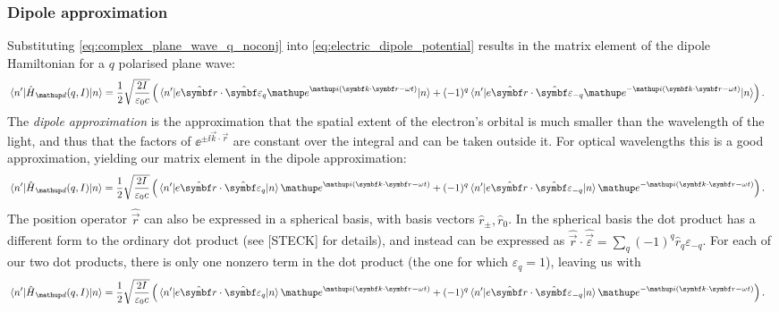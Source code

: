 \subsubsection{Dipole approximation}

Substituting \eqref{eq:complex_plane_wave_q_noconj} into \eqref{eq:electric_dipole_potential} results in the matrix element of the dipole Hamiltonian for a $q$ polarised plane wave:
\begin{align}
\matrixel{n^\prime}{\hat H_\up{d}(q,I)}{n} &= 
\frac12\sqrt{\frac{2I}{\varepsilon_0 c}}\left(
\matrixel{n^\prime}
  {e\hat{\vec r}\cdot\hat{\vec\varepsilon}_q \ee^{\ii(\vec k \cdot \vec r - \omega t)}}
  {n}
+(-1)^q
\matrixel{n^\prime}
  {e\hat{\vec r}\cdot\hat{\vec\varepsilon}_{-q} \ee^{-\ii(\vec k \cdot \vec r - \omega t)}}
  {n}\right).
\end{align}
The \emph{dipole approximation} is the approximation that the spatial extent of the electron's orbital is much smaller than the wavelength of the light, and thus that the factors of $\ee^{\pm\ii\vec k\cdot\vec r}$ are constant over the integral and can be taken outside it. For optical wavelengths this is a good approximation, yielding our matrix element in the dipole approximation:
\begin{align}
\matrixel{n^\prime}{\hat H_\up{d}(q,I)}{n} &= 
\frac12\sqrt{\frac{2I}{\varepsilon_0 c}}\left(
\matrixel{n^\prime}
  {e\hat{\vec r}\cdot\hat{\vec\varepsilon}_q}
  {n}\ee^{\ii(\vec k \cdot \vec r - \omega t)}
+(-1)^q
\matrixel{n^\prime}
  {e\hat{\vec r}\cdot\hat{\vec\varepsilon}_{-q}}
  {n} \ee^{-\ii(\vec k \cdot \vec r - \omega t)}\right).
\end{align}
The position operator $\hat{\vec r}$ can also be expressed in a spherical basis, with basis vectors $\hat r_{\pm},\hat r_0$. In the spherical basis the dot product has a different form to the ordinary dot product (see [STECK] for details), and instead can be expressed as $\hat {\vec r}\cdot\hat{\vec\varepsilon} = \sum_q(-1)^q \hat r_q \varepsilon_{-q}$. For each of our two dot products, there is only one nonzero term in the dot product (the one for which $\varepsilon_q=1$), leaving us with
\begin{align}
\matrixel{n^\prime}{\hat H_\up{d}(q,I)}{n} &= 
\frac12\sqrt{\frac{2I}{\varepsilon_0 c}}\left(
\matrixel{n^\prime}
  {e\hat{\vec r}\cdot\hat{\vec\varepsilon}_q}
  {n}\ee^{\ii(\vec k \cdot \vec r - \omega t)}
+(-1)^q
\matrixel{n^\prime}
  {e\hat{\vec r}\cdot\hat{\vec\varepsilon}_{-q}}
  {n} \ee^{-\ii(\vec k \cdot \vec r - \omega t)}\right).
\end{align}
